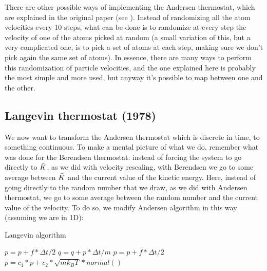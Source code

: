 There are other possible ways of implementing the Andersen thermostat, which are explained in the original paper (see \cite{Andersen}). Instead of randomizing all the atom velocities every 10 steps, what can be done is to randomize at every step the velocity of one of the atoms picked at random (a small variation of this, but a very complicated one, is to pick a set of atoms at each step, making sure we don't pick again the same set of atoms). In essence, there are many ways to perform this randomization of particle velocities, and the one explained here is probably the most simple and more used, but anyway it's possible to map between one and the other.

\subsection{Langevin thermostat (1978)}

We now want to transform the Andersen thermostat which is discrete in time, to something continuous. 
To make a mental picture of what we do, remember what was done for the Berendsen thermostat: instead of forcing the system to go directly to $\Bar{K}$, as we did with velocity rescaling, with Berendsen we go to some average between $\Bar{K}$ and the current value of the kinetic energy. Here, instead of going directly to the random number that we draw, as we did with Andersen thermostat, we go to some average between the random number and the current value of the velocity.
To do so, we modify Andersen algorithm in this way (assuming we are in 1D):

 \begin{algorithm}[H]\label{Langevin_algorithm}
			\caption{Langevin algorithm}
			\begin{algorithmic}[1]
				\State $p=p+f*\Delta t/2$
				\State $q=q+p*\Delta t/m$
				\State $p=p+f*\Delta t/2$
				\State $p=c_1*p+c_2*\sqrt{mk_BT}*normal()$
				\EndFor
			\end{algorithmic}
\end{algorithm}
		

